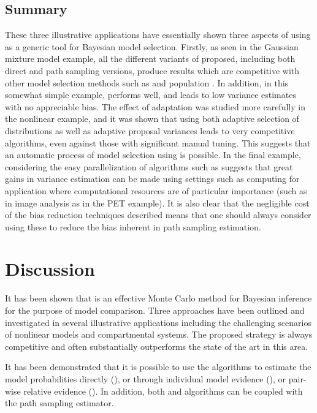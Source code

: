 \subsection{Summary}

These three illustrative applications have essentially shown three aspects of
using \smc as a generic tool for Bayesian model selection. Firstly, as seen in
the Gaussian mixture model example, all the different variants of \smc
proposed, including both direct and path sampling versions, produce results
which are competitive with other model selection methods such as \rjmcmc and
population \mcmc. In addition, in this somewhat simple example, \smc[2]
performs well, and leads to low variance estimates with no appreciable bias.
The effect of adaptation was studied more carefully in the nonlinear \ode
example, and it was shown that using both adaptive selection of distributions
as well as adaptive proposal variances leads to very competitive algorithms,
even against those with significant manual tuning. This suggests that an
automatic process of model selection using \smc[2] is possible. In the final
example, considering the easy parallelization of algorithms such as \smc[2]
suggests that great gains in variance estimation can be made using settings
such as \gpu computing for application where computational resources are of
particular importance (such as in image analysis as in the PET example). It is
also clear that the negligible cost of the bias reduction techniques described
means that one should always consider using these to reduce the bias inherent
in path sampling estimation.

\section{Discussion}
\label{sec:Bayesian SMC discussion}

It has been shown that \smc is an effective Monte Carlo method for Bayesian
inference for the purpose of model comparison. Three approaches have been
outlined and investigated in several illustrative applications including the
challenging scenarios of nonlinear \ode models and \pet compartmental systems.
The proposed strategy is always competitive and often substantially
outperforms the state of the art in this area.

It has been demonstrated that it is possible to use the \smc algorithms to
estimate the model probabilities directly (\smc[1]), or through individual
model evidence (\smc[2]), or pair-wise relative evidence (\smc[3]). In
addition, both \smc[2] and \smc[3] algorithms can be coupled with the path
sampling estimator.

